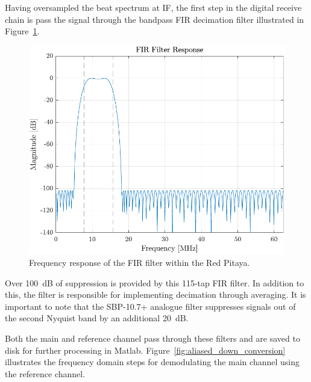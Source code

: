 \documentclass[a4paper,11pt]{report}
\begin{document}
Having oversampled the beat spectrum at IF, the first step in the digital receive chain is pass the signal through the bandpass FIR decimation filter illustrated in Figure~\ref{fig:fir_filter}.  
\begin{figure}[h!]
    \begin{center}
        \includegraphics[width=\textwidth]{images/fir_filter}
        \caption{Frequency response of the FIR filter within the Red Pitaya.}
        \label{fig:fir_filter}
    \end{center}
\end{figure}

Over \SI{100}{\dB} of suppression is provided by this 115-tap FIR filter. In addition to this, the filter is responsible for implementing decimation through averaging. It is important to note that the SBP-10.7+ analogue filter suppresses signals out of the second Nyquist band by an additional \SI{20}{\dB}.  

Both the main and reference channel pass through these filters and are saved to disk for further processing in Matlab. Figure~\ref{fig:aliased_down_conversion} illustrates the frequency domain steps for demodulating the main channel using the reference channel.
\end{document}
